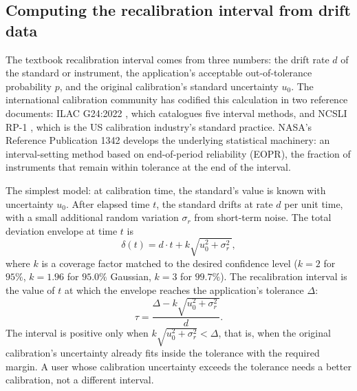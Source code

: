 \subsection{Computing the recalibration interval from drift data}

The textbook recalibration interval comes from three numbers: the
drift rate $d$ of the standard or instrument, the application's
acceptable out-of-tolerance probability $p$, and the original
calibration's standard uncertainty $u_{0}$. The international
calibration community has codified this calculation in two
reference documents: ILAC G24:2022
\cite{std:ch03t3-ilac-g24-2022}, which catalogues five interval
methods, and NCSLI RP-1 \cite{web:ch03t3-ncsli-rp-1-2010}, which is
the US calibration industry's standard practice. NASA's Reference
Publication 1342 \cite{std:ch03t3-nasa-rp-1342-1994} develops the
underlying statistical machinery: an interval-setting method based
on end-of-period reliability (EOPR), the fraction of instruments
that remain within tolerance at the end of the interval.

The simplest model: at calibration time, the standard's value is
known with uncertainty $u_{0}$. After elapsed time $t$, the
standard drifts at rate $d$ per unit time, with a small additional
random variation $\sigma_{r}$ from short-term noise. The total
deviation envelope at time $t$ is
\[
\delta(t) = d \cdot t + k \sqrt{u_{0}^{2} + \sigma_{r}^{2}\,},
\]
where $k$ is a coverage factor matched to the desired confidence
level ($k = 2$ for $95\%$, $k = 1.96$ for $95.0\%$ Gaussian, $k =
3$ for $99.7\%$). The recalibration interval is the value of $t$
at which the envelope reaches the application's tolerance $\Delta$:
\[
\tau = \frac{\Delta - k \sqrt{u_{0}^{2} + \sigma_{r}^{2}\,}}{d}.
\]
The interval is positive only when $k\sqrt{u_{0}^{2} +
\sigma_{r}^{2}} < \Delta$, that is, when the original calibration's
uncertainty already fits inside the tolerance with the required
margin. A user whose calibration uncertainty exceeds the tolerance
needs a better calibration, not a different interval.

